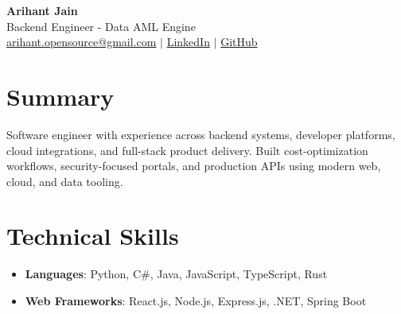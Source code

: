 \documentclass[11pt,a4paper]{article}
\begin{document}
\begin{center}
{\LARGE \textbf{Arihant Jain}}
\\ Backend Engineer - Data AML Engine
\\ \href{mailto:arihant.opensource@gmail.com}{arihant.opensource@gmail.com} $\mid$ \href{https://linkedin.com/in/arihantjain1208}{LinkedIn} $\mid$ \href{https://github.com/Arihant1208}{GitHub}
\end{center}

\section{Summary}
Software engineer with experience across backend systems, developer platforms, cloud integrations, and full-stack product delivery. Built cost-optimization workflows, security-focused portals, and production APIs using modern web, cloud, and data tooling.

\section{Technical Skills}
\begin{itemize}
  \item \textbf{Languages}: Python, C\#, Java, JavaScript, TypeScript, Rust
  \item \textbf{Web Frameworks}: React.js, Node.js, Express.js, .NET, Spring Boot
\end{itemize}
\end{document}
